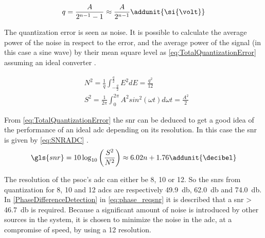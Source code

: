 \begin{equation} \label{eq:QuantizationError}
q=\frac{A}{2^{n-1}-1}\approx \frac{A}{2^{n-1}} \addunit{\si{\volt}}
\end{equation}
\startexplain
{}
\stopexplain

The quantization error is seen as noise. It is possible to calculate the average power of the noise in respect to the error, and the average power of the signal (in this case a sine wave) by their mean square level as \autoref{eq:TotalQuantizationError} assuming an ideal converter \citep{AppReport:ADCQuantization}.

\begin{subequations} \label{eq:TotalQuantizationError}
	\begin{align}
		&N^2 =\frac{1}{q}\int_{-\frac{q}{2}}^{\frac{q}{2}}E^2dE=\frac{q^2}{12} \\
		&S^2 = \frac{1}{2\pi}\int_{0}^{2\pi}A^2sin^2(\omega t)d\omega t=\frac{A^2}{2}
	\end{align}
\end{subequations}
\startexplain
{}
\stopexplain

From \autoref{eq:TotalQuantizationError} the \gls{snr} can be deduced to get a good idea of the performance of an ideal \gls{adc} depending on its resolution. In this case the \gls{snr} is given by \autoref{eq:SNRADC} \citep{AppReport:ADCQuantization}.
\begin{equation} \label{eq:SNRADC}
		\gls{snr}=10\log_{10}\left( \frac{S^2}{N^2} \right)\approx 6.02n + 1.76 \addunit{\decibel}
\end{equation}
%

The resolution of the \gls{psoc}'s \gls{adc} can either be \SI{8}{\bit}, \SI{10}{\bit} or \SI{12}{\bit}.
So the \glspl{snr} from quantization for \SI{8}{\bit}, \SI{10}{\bit} and \SI{12}{\bit} \glspl{adc} are respectively \SI{49,9}{\decibel}, \SI{62,0}{\decibel} and \SI{74,0}{\decibel}. 
In \autoref{PhaseDifferenceDetection} in \autoref{eq:phase_reqsnr} it is described that a \gls{snr} > \SI{46,7}{\decibel} is required. Because a significant amount of noise is introduced by other sources in the system, it is chosen to minimize the noise in the \gls{adc}, at a compromise of speed, by using a \SI{12}{\bit} resolution.

